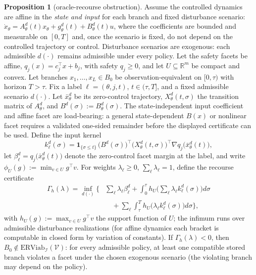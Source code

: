 \documentclass[10pt,twocolumn]{article}
\theoremstyle{definition}
\newtheorem{proposition}{Proposition}
\begin{document}
\begin{proposition}[oracle-recourse obstruction]\label{calc-prop:recourse}
Assume the controlled dynamics are affine in the \emph{state and input}
for each branch and fixed disturbance scenario:
\(\dot x_\theta = A_\theta^d(t)x_\theta + g_\theta^d(t)
+ B_\theta^d(t)u\), where the coefficients are bounded and measurable
on \([0,T]\) and, once the scenario is fixed, do not depend on the
controlled trajectory or control. Disturbance scenarios are exogenous:
each admissible \(d(\cdot)\) remains admissible under every policy.
Let the safety facets be affine,
\(q_j(x)=c_j^\top x+b_j\), with safety \(q_j\ge0\), and let
\(U\subseteq\mathbb{R}^m\) be compact and convex. Let branches
\(x_1,\dots,x_L\in B_0\) be observation-equivalent on \([0,\tau)\)
with horizon \(T>\tau\). Fix a label
\(\ell=(\theta,j,t)\), \(t\in(\tau,T]\), and a fixed admissible
scenario \(d(\cdot)\). Let \(\bar x_\theta^d\) be its zero-control
trajectory, \(X_\theta^d(t,\sigma)\) the transition matrix of
\(A_\theta^d\), and \(B^d(\sigma):=B_\theta^d(\sigma)\).
The state-independent input coefficient and affine facet are
load-bearing: a general state-dependent \(B(x)\) or nonlinear facet
requires a validated one-sided remainder before the displayed certificate
can be used.
Define the input kernel
\[k_\ell^d(\sigma) = \mathbf{1}_{\{\sigma \le t\}}\,
\big(B^d(\sigma)\big)^{\top}
\big(X_\theta^d(t, \sigma)\big)^{\top}
\nabla q_j\big(\bar x_\theta^d(t)\big),\]
let \(\beta_\ell^d = q_j\big(\bar x_\theta^d(t)\big)\) denote the
zero-control facet margin at the label, and write
\(\phi_U(g) := \min_{v \in U} g^{\top} v\). For weights
\(\lambda_\ell \ge 0\), \(\sum_\ell \lambda_\ell = 1\), define the recourse certificate \[\begin{aligned} \Gamma_{h}(\lambda) = \inf_{d(\cdot)} \Big\{ &\sum_{\ell} \lambda_{\ell} \beta_{\ell}^{d} + \int_0^{\tau} h_U\Big(\sum_{\ell} \lambda_\ell k_\ell^d(\sigma)\Big) d\sigma \\ &\quad + \sum_{\ell} \int_{\tau}^{T} h_U\big(\lambda_\ell k_\ell^d(\sigma)\big) d\sigma \Big\}, \end{aligned}\] with \(h_U(g) := \max_{v \in U} g^{\top} v\) the support function of \(U\); the infimum runs over admissible disturbance realizations (for affine dynamics each bracket is computable in closed form by variation of constants). If \(\Gamma_{h}(\lambda) < 0\), then \(B_0 \notin \mathrm{ERViab}_{\mathcal{I}}(\mathcal{V})\): for every admissible policy, at least one compatible stored branch violates a facet under the chosen exogenous scenario (the violating branch may depend on the policy).
\end{proposition}
\end{document}

